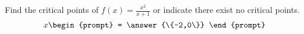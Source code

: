 \documentclass{ximera}
\author{Gregory Hartman \and Matthew Carr}
\begin{document}
\begin{exercise}






Find the critical points of $f(x)=\frac{x^2}{x+1}$ or indicate there exist no critical points.
\[
x
\begin{prompt}
= \answer{\{-2,0\}}
\end{prompt}
\]

\end{exercise}
\end{document}
